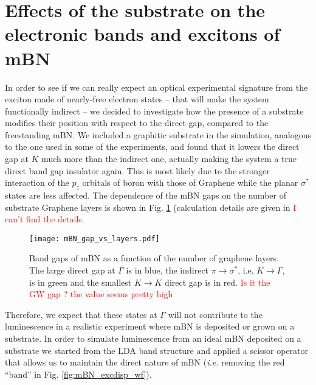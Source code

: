 \section{Effects of the substrate on the electronic bands and excitons of mBN}
In order to see if we can really expect an optical experimental signature from the exciton made of nearly-free electron states -- that will make the system functionally indirect -- we decided to investigate how the presence of a substrate modifies their position with respect to the direct gap, compared to the freestanding mBN. We included a graphitic substrate in the simulation, analogous to the one used in some of the experiments, and found that it lowers the direct gap at $K$ much more than the indirect one, actually making the system a true direct band gap insulator again. This is most likely due to the stronger interaction of the $p_z$ orbitals of boron with those of Graphene while the planar $\sigma^*$ states are less affected. The dependence of the mBN gaps on the number of substrate Graphene layers is shown in Fig. \ref{fig:mBN_gap_layers} (calculation details are given in \textcolor{red}{I can't find the details.}%
\begin{figure}[H]
	\vspace{0.2cm}
	\setcapindent{2em}
	\centering
	\texttt{[image: mBN\_gap\_vs\_layers.pdf]}
	\caption{Band gaps of mBN as a function of the number of graphene layers\label{gap_vs_layers}. The large direct gap at $\Gamma$ is in blue, the indirect $\pi\rightarrow\sigma^*$, i.e. $K\rightarrow\Gamma$, is in green and the smallest $K\rightarrow K$ direct gap is in red. \textcolor{red}{Is it the GW gap ? the value seems pretty high}} %
	\label{fig:mBN_gap_layers}
\end{figure}
Therefore, we expect that these states at $\Gamma$ will not contribute to the luminescence in a realistic experiment where mBN is deposited or grown on a substrate.
In order to simulate luminescence from an ideal mBN deposited on a substrate we started from the LDA band structure and applied a scissor operator that allows us to maintain the direct nature of mBN (\textit{i.e.} removing the red ``band'' in Fig. \ref{fig:mBN_excdisp_wf}). 

